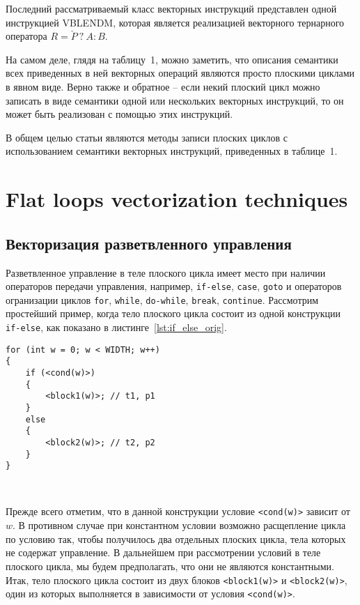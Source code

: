 \documentclass[
11pt,%
tightenlines,%
twoside,%
onecolumn,%
nofloats,%
nobibnotes,%
nofootinbib,%
superscriptaddress,%
noshowpacs,%
centertags]%
{revtex4}
\begin{document}
Последний рассматриваемый класс векторных инструкций представлен одной инструкцией VBLENDM, которая является реализацией векторного тернарного оператора $R = \check{P} \ ? \ A : B$.

На самом деле, глядя на таблицу~1, можно заметить, что описания семантики всех приведенных в ней векторных операций являются просто плоскими циклами в явном виде.
Верно также и обратное -- если некий плоский цикл можно записать в виде семантики одной или нескольких векторных инструкций, то он может быть реализован с помощью этих инструкций.

В общем целью статьи являются методы записи плоских циклов с использованием семантики векторных инструкций, приведенных в таблице~1.

\section{Flat loops vectorization techniques}

\subsection{Векторизация разветвленного управления}

Разветвленное управление в теле плоского цикла имеет место при наличии операторов передачи управления, например, \texttt{if-else}, \texttt{case}, \texttt{goto} и операторов огранизации циклов \texttt{for}, \texttt{while}, \texttt{do-while}, \texttt{break}, \texttt{continue}.
Рассмотрим простейший пример, когда тело плоского цикла состоит из одной конструкции \texttt{if-else}, как показано в листинге~\ref{lst:if_else_orig}.

\begin{lstlisting}[caption={Тело плоского цикла, состоящее из конструкции \texttt{if-else}.},label={lst:if_else_orig}]
for (int w = 0; w < WIDTH; w++)
{
    if (<cond(w)>)
    {
        <block1(w)>; // t1, p1
    }
    else
    {
        <block2(w)>; // t2, p2
    }
}
\end{lstlisting}

\

Прежде всего отметим, что в данной конструкции условие \texttt{<cond(w)>} зависит от $w$.
В противном случае при константном условии возможно расщепление цикла по условию так, чтобы получилось два отдельных плоских цикла, тела которых не содержат управление.
В дальнейшем при рассмотрении условий в теле плоского цикла, мы будем предполагать, что они не являются константными.
Итак, тело плоского цикла состоит из двух блоков \texttt{<block1(w)>} и \texttt{<block2(w)>}, один из которых выполняется в зависимости от условия \texttt{<cond(w)>}.
\end{document}
